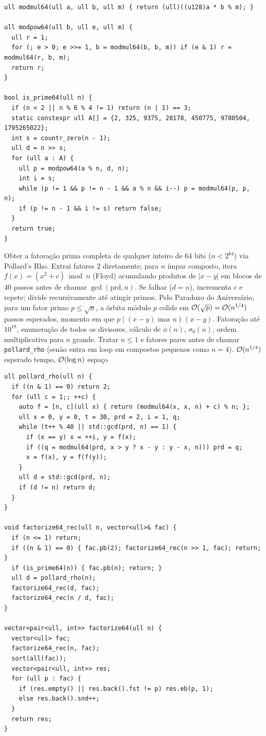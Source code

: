 \begin{lstlisting}
ull modmul64(ull a, ull b, ull m) { return (ull)((u128)a * b % m); }

ull modpow64(ull b, ull e, ull m) {
  ull r = 1;
  for (; e > 0; e >>= 1, b = modmul64(b, b, m)) if (e & 1) r = modmul64(r, b, m);
  return r;
}

bool is_prime64(ull n) {
  if (n < 2 || n % 6 % 4 != 1) return (n | 1) == 3;
  static constexpr ull A[] = {2, 325, 9375, 28178, 450775, 9780504, 1795265022};
  int s = countr_zero(n - 1);
  ull d = n >> s;
  for (ull a : A) {
    ull p = modpow64(a % n, d, n);
    int i = s;
    while (p != 1 && p != n - 1 && a % n && i--) p = modmul64(p, p, n);
    if (p != n - 1 && i != s) return false;
  }
  return true;
}
\end{lstlisting}

\algobox
  {Obter a fatoração prima completa de qualquer inteiro de 64 bits ($n < 2^{64}$) via Pollard's Rho.}
  {Extrai fatores $2$ diretamente; para $n$ ímpar composto, itera $f(x) = (x^2 + c) \bmod n$ (Floyd) acumulando produtos de $|x - y|$ em blocos de 40 passos antes de chamar $\gcd(\text{prd}, n)$. Se falhar ($d = n$), incrementa $c$ e repete; divide recursivamente até atingir primos.}
  {Pelo Paradoxo do Aniversário, para um fator primo $p \le \sqrt{n}$, a órbita módulo $p$ colide em $\mathcal{O}(\sqrt{p}) = \mathcal{O}(n^{1/4})$ passos esperados, momento em que $p \mid (x - y)$ mas $n \nmid (x - y)$.}
  {Fatoração até $10^{18}$, enumeração de todos os divisores, cálculo de $\phi(n)$, $\sigma_0(n)$, ordem multiplicativa para $n$ grande.}
  {Tratar $n \le 1$ e fatores pares antes de chamar \texttt{pollard\_rho} (senão entra em loop em compostos pequenos como $n = 4$).}
  {$\mathcal{O}(n^{1/4})$ esperado tempo, $\mathcal{O}(\log n)$ espaço}

\begin{lstlisting}
ull pollard_rho(ull n) {
  if ((n & 1) == 0) return 2;
  for (ull c = 1;; ++c) {
    auto f = [n, c](ull x) { return (modmul64(x, x, n) + c) % n; };
    ull x = 0, y = 0, t = 30, prd = 2, i = 1, q;
    while (t++ % 40 || std::gcd(prd, n) == 1) {
      if (x == y) x = ++i, y = f(x);
      if ((q = modmul64(prd, x > y ? x - y : y - x, n))) prd = q;
      x = f(x), y = f(f(y));
    }
    ull d = std::gcd(prd, n);
    if (d != n) return d;
  }
}

void factorize64_rec(ull n, vector<ull>& fac) {
  if (n <= 1) return;
  if ((n & 1) == 0) { fac.pb(2); factorize64_rec(n >> 1, fac); return; }
  if (is_prime64(n)) { fac.pb(n); return; }
  ull d = pollard_rho(n);
  factorize64_rec(d, fac);
  factorize64_rec(n / d, fac);
}

vector<pair<ull, int>> factorize64(ull n) {
  vector<ull> fac;
  factorize64_rec(n, fac);
  sort(all(fac));
  vector<pair<ull, int>> res;
  for (ull p : fac) {
    if (res.empty() || res.back().fst != p) res.eb(p, 1);
    else res.back().snd++;
  }
  return res;
}
\end{lstlisting}
